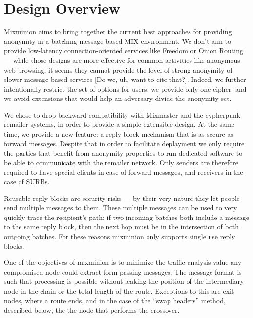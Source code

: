 \documentclass{llncs}
\begin{document}


\section{Design Overview}
\label{sec:design}

Mixminion aims to bring together the current best approaches for providing
anonymity in a batching message-based MIX environment. We don't aim
to provide low-latency connection-oriented services like Freedom
\cite{freedom} or Onion Routing \cite{onion-routing,goldschlag99} --- while those
designs are more effective for common activities like anonymous web
browsing, it seems they cannot provide the level of strong anonymity of
slower message-based services [Do we, uh, want to cite that?]. Indeed, we
further intentionally restrict the set of options for users: we provide
only one cipher, and we avoid extensions that would help an adversary
divide the anonymity set.

We chose to drop backward-compatibility with Mixmaster and the cypherpunk
remailer systems, in order to provide a simple extensible design. At
the same time, we provide a new feature: a reply block mechanism that
is as secure as forward messages. Despite that in order to facilitate
deplayment we only require the parties that benefit from anonymity 
properties to run dedicated software to be able to communicate with 
the remailer network. Only senders are therefore required to have special
clients in case of forward messages, and receivers in the case of SURBs.

Reusable reply blocks are security risks --- by their very nature they
let people send multiple messages to them. These multiple messages can be
used to very quickly trace the recipient's path: if two incoming batches
both include a message to the same reply block, then the next hop must
be in the intersection of both outgoing batches. For these reasons 
mixminion only supports single use reply blocks.

One of the objectives of mixminion is to minimize the traffic analysis 
value any compromised node could extract form passing messages. The 
message format is such that processing is possible without leaking the
position of the intermediary node in the chain or the total length
of the route. Exceptions to this are exit nodes, where a route ends, 
and in the case of the ``swap headers'' method, described below, the
the node that performs the crossover.
\end{document}
